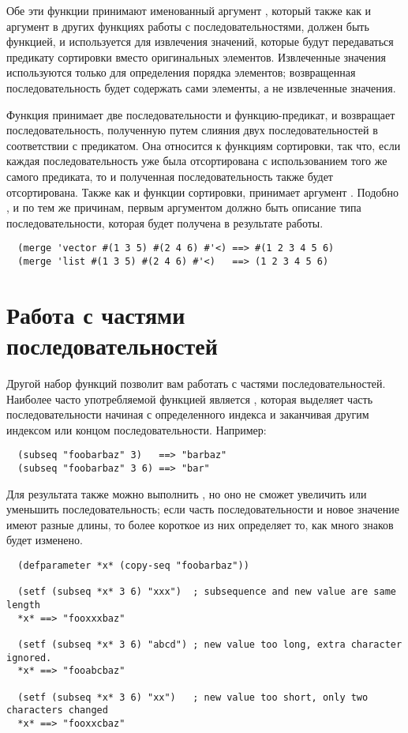 Обе эти функции принимают именованный аргумент , который также как и аргумент
 в других функциях работы с последовательностями, должен быть функцией, и
используется для извлечения значений, которые будут передаваться предикату сортировки
вместо оригинальных элементов.  Извлеченные значения используются только для определения
порядка элементов; возвращенная последовательность будет содержать сами элементы, а не
извлеченные значения.

Функция  принимает две последовательности и функцию-предикат, и возвращает
последовательность, полученную путем слияния двух последовательностей в соответствии с
предикатом.  Она относится к функциям сортировки, так что, если каждая последовательность
уже была отсортирована с использованием того же самого предиката, то и полученная
последовательность также будет отсортирована.  Также как и функции сортировки,
 принимает аргумент .  Подобно , и по тем же
причинам, первым аргументом  должно быть описание типа последовательности,
которая будет получена в результате работы.

\begin{verbatim}
  (merge 'vector #(1 3 5) #(2 4 6) #'<) ==> #(1 2 3 4 5 6)
  (merge 'list #(1 3 5) #(2 4 6) #'<)   ==> (1 2 3 4 5 6)
\end{verbatim}

\section{Работа с частями последовательностей}

Другой набор функций позволит вам работать с частями последовательностей.  Наиболее часто
употребляемой функцией является , которая выделяет часть последовательности
начиная с определенного индекса и заканчивая другим индексом или концом
последовательности.  Например:

\begin{verbatim}
  (subseq "foobarbaz" 3)   ==> "barbaz"
  (subseq "foobarbaz" 3 6) ==> "bar"
\end{verbatim}

Для результата  также можно выполнить , но оно не сможет увеличить
или уменьшить последовательность; если часть последовательности и новое значение имеют
разные длины, то более короткое из них определяет то, как много знаков будет изменено.

\begin{verbatim}
  (defparameter *x* (copy-seq "foobarbaz"))

  (setf (subseq *x* 3 6) "xxx")  ; subsequence and new value are same length
  *x* ==> "fooxxxbaz"

  (setf (subseq *x* 3 6) "abcd") ; new value too long, extra character ignored.
  *x* ==> "fooabcbaz"

  (setf (subseq *x* 3 6) "xx")   ; new value too short, only two characters changed
  *x* ==> "fooxxcbaz"
\end{verbatim}

